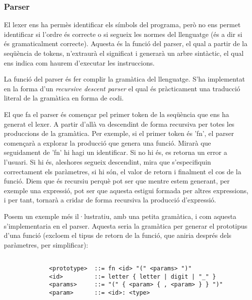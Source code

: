 ﻿\documentclass{article}
\begin{document}
            \subsubsection{Parser}

                El lexer ens ha permès identificar els símbols del programa, 
                però no ens permet identificar si l'ordre és correcte o si segueix
                les normes del llenguatge (és a dir si és gramaticalment correcte).
                Aquesta és la funció del parser, el qual a partir de la seqüència 
                de tokens, n'extraurà el significat i generarà un arbre sintàctic,
                el qual ens indica com haurem d'executar les instruccions.

                La funció del parser és fer complir la gramàtica del llenguatge.
                S'ha implementat en la forma d'un \textit{recursive descent parser}
                el qual és pràcticament una traducció literal de la gramàtica en
                forma de codi.

                El que fa el parser és començar pel primer token de la seqüència
                que ens ha generat el lexer. A partir d'allà va descendint de 
                forma recursiva per totes les produccions de la gramàtica. Per
                exemple, si el primer token és 'fn', el parser començarà a 
                explorar la producció que genera una funció. Mirarà que seguidament
                de 'fn' hi hagi un identificar. Si no hi és, es retorna un error
                a l'usuari. Si hi és, aleshores segueix descendint, mira que 
                s'especifiquin correctament els paràmetres, si hi són, el valor
                de retorn i finalment el cos de la funció. Diem que és recursiu
                perquè pot ser que mentre estem generant, per exemple una expressió,
                pot ser que aquesta estigui formada per altres expressions, i per
                tant, tornarà a cridar de forma recursiva la producció d'expressió.

                Posem un exemple més il·lustratiu, amb una petita gramàtica, i com
                aquesta s'implementaria en el parser. Aquesta seria la gramàtica
                per generar el prototipus d'una funció (excloem el tipus de retorn
                de la funció, que aniria després dels paràmetres, per simplificar):

                \begin{verbatim}

             <prototype>  ::= fn <id> "(" <params> ")"
             <id>         ::= letter { letter | digit | "_" }
             <params>     ::= "(" { <param> { , <param> } } ")"
             <param>      ::= <id>: <type>

                \end{verbatim}
\end{document}
